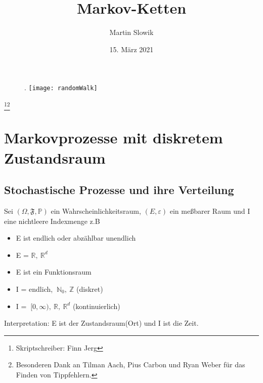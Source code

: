 \documentclass[a4paper,12pt]{scrartcl}
\title{Markov-Ketten}
\author{Martin Slowik}
\date{15. März 2021}
\theoremstyle{definition}
\begin{document}
\maketitle
\begin{figure}[H].
\centering
\texttt{[image: randomWalk]}
\end{figure}
\renewcommand{\thefootnote}{}
\footnote{Skriptschreiber: Finn Jerg}\footnote{Besonderen Dank an Tilman Aach, Pius Carbon und Ryan Weber für das Finden von Tippfehlern.}
\vspace{2cm}
\noindent
\tableofcontents

\vspace*{13cm}
\clearpairofpagestyles
\ohead{\pagemark}
\pagestyle{scrheadings}

\section{Markovprozesse mit diskretem Zustandsraum}


\subsection{Stochastische Prozesse und ihre Verteilung}
Sei $(\Omega, \mathfrak{F}, \mathbb{P})$ ein Wahrscheinlichkeitsraum, $(E, \varepsilon)$ ein meßbarer Raum und I eine nichtleere Indexmenge z.B 
\begin{itemize}
    \item E ist endlich oder abzählbar unendlich
    \item E = $\mathbb{R},\: \mathbb{R}^{d}$
    \item E ist ein Funktionsraum
    \item I = endlich, $\: \mathbb{N}_{0},\: \mathbb{Z}$ (diskret)
    \item I = $\: [0,\infty), \:\mathbb{R}, \:\mathbb{R}^{d}$ (kontinuierlich)
\end{itemize}
Interpretation: E ist der Zustandsraum(\glqq Ort\grqq{}) und I ist die \glqq Zeit\grqq{}.
\end{document}
